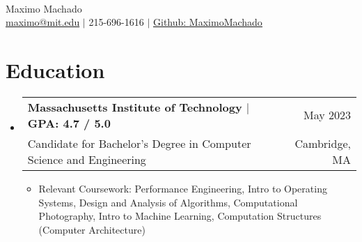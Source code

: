 \documentclass[letterpaper,12pt]{article} %
\makeatletter
\newcommand{\CVItem}[1]{
  \item\small{
    {#1 \vspace{-2pt}}
  }
}
\newcommand{\CVSubheading}[4]{
  \vspace{-2pt}\item
    \begin{tabular*}{0.97\textwidth}[t]{l@{\extracolsep{\fill}}r}
      \textbf{#1} & #2 \\
      \small#3 & \small #4 \\
    \end{tabular*}\vspace{-7pt}
}
\newcommand{\CVSubHeadingListStart}{\begin{itemize}[leftmargin=0.15in, label={}]} %
\newcommand{\CVSubHeadingListEnd}{\end{itemize}}
\newcommand{\CVItemListStart}{\begin{itemize}}
\newcommand{\CVItemListEnd}{\end{itemize}\vspace{-5pt}}
\makeatother
\begin{document}

\begin{minipage}[c]{0.05\textwidth}
  \-\
\end{minipage}

\begin{center}
  \Huge Maximo Machado \\ \vspace{1pt} %
  \small
  \href{mailto:maximo@mit.edu}{maximo@mit.edu} $|$
  215-696-1616 $|$
  \href{https://github.com/MaximoMachado}{Github: \underline{MaximoMachado}}
\end{center}
\vspace{-10pt} %

\section{Education}
\CVSubHeadingListStart
\CVSubheading
{{Massachusetts Institute of Technology $|$ \small{GPA: 4.7 / 5.0}}}{May 2023}
{Candidate for Bachelor's Degree in Computer Science and Engineering}{Cambridge, MA}

\CVItemListStart
\CVItem{Relevant Coursework:
  Performance Engineering,
  Intro to Operating Systems,
  Design and Analysis of Algorithms,
  Computational Photography,
  Intro to Machine Learning,
  Computation Structures (Computer Architecture)
  }
\CVItemListEnd
\CVSubHeadingListEnd

\vspace{-10pt} %
\end{document}
